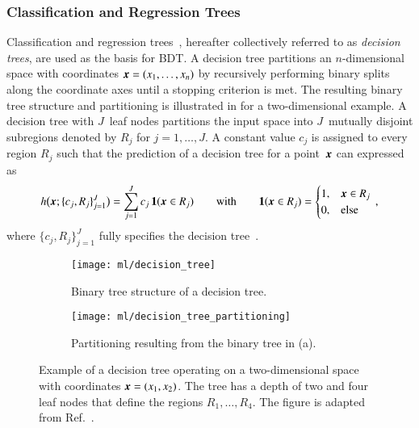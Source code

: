 \subsubsection{Classification and Regression Trees}

Classification and regression trees~\cite{Breiman:1984jka,hastie09}, hereafter
collectively referred to as \emph{decision trees}, are used as the basis for
BDT. A decision tree partitions an $n$-dimensional space with coordinates
$\myvec{x} = (x_1, \dots, x_n)$ by recursively performing binary splits along
the coordinate axes until a stopping criterion is met. The resulting binary tree
structure and partitioning is illustrated in  for a
two-dimensional example. A decision tree with $J$~leaf nodes partitions the
input space into $J$~mutually disjoint subregions denoted by $R_j$ for
$j = 1, \dots, J$. A constant value $c_j$ is assigned to every region $R_j$ such
that the prediction of a decision tree for a point~$\myvec{x}$ can expressed as
\begin{align*}
  h\bigl( \myvec{x}; \{c_j, R_j\}_{j=1}^{J} \bigr) = \sum_{j = 1}^{J} c_j \, \mathbf{1}(\myvec{x} \in R_j) \qquad \text{with} \qquad \mathbf{1}(\myvec{x} \in R_j) =
  \begin{cases}
    1, & \myvec{x} \in R_j \\
    0, & \text{else}
  \end{cases} \,\text{,}
\end{align*}
where $\{c_j, R_j\}_{j=1}^{J}$ fully specifies the decision
tree~\cite{hastie09}.

\begin{figure}[htbp]
  \centering

  \begin{subfigure}[b]{0.46\textwidth}
    \centering
    \texttt{[image: ml/decision\_tree]}
    \caption{Binary tree structure of a decision tree.}
  \end{subfigure}\hfill%
  \begin{subfigure}[b]{0.46\textwidth}
    \centering
    \texttt{[image: ml/decision\_tree\_partitioning]}
    \vspace*{0.7em}
    \caption{Partitioning resulting from the binary tree in (a).}
  \end{subfigure}\hfill%

  \caption{Example of a decision tree operating on a two-dimensional space with
    coordinates $\myvec{x} = (x_1, x_2)$. The tree has a depth of two and four
    leaf nodes that define the regions $R_1, \dots, R_4$. The figure is adapted
    from Ref.~\cite{hastie09}.}%
  \label{fig:decision_tree}
\end{figure}

